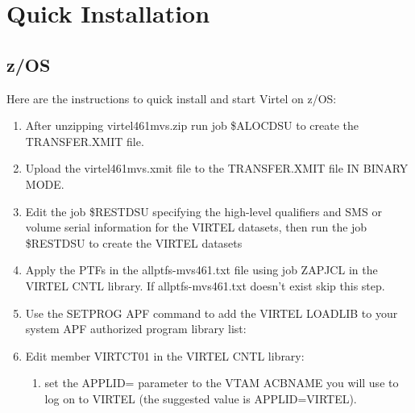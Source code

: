\documentclass[letterpaper,10pt,english]{sphinxmanual}
\begin{document}
\chapter{Quick Installation}
\label{\detokenize{Getting_Started:quick-installation}}

\section{z/OS}
\label{\detokenize{Getting_Started:z-os}}
Here are the instructions to quick install and start Virtel on z/OS:
\begin{enumerate}
\def\theenumi{\arabic{enumi}}
\def\labelenumi{\theenumi .}
\makeatletter\def\p@enumii{\p@enumi \theenumi .}\makeatother
\item {} 
After unzipping virtel461mvs.zip run job \$ALOCDSU to create the TRANSFER.XMIT file.

\item {} 
Upload the virtel461mvs.xmit file to the TRANSFER.XMIT file IN BINARY MODE.

\item {} 
Edit the job \$RESTDSU specifying the high-level qualifiers and SMS or volume serial information for the VIRTEL datasets, then run the job \$RESTDSU to create the VIRTEL datasets

\item {} 
Apply the PTFs in the allptfs-mvs461.txt file using job ZAPJCL in the VIRTEL CNTL library. If allptfs-mvs461.txt doesn’t exist skip this step.

\item {} 
Use the SETPROG APF command to add the VIRTEL LOADLIB to your system APF authorized program library list:

\begin{sphinxVerbatim}[commandchars=\\\{\}]
 
\end{sphinxVerbatim}

\item {} 
Edit member VIRTCT01 in the VIRTEL CNTL library:
\begin{enumerate}
\def\theenumii{\alph{enumii}}
\def\labelenumii{(\theenumii )}
\makeatletter\def\p@enumiii{\p@enumii (\theenumii )}\makeatother
\item {} 
set the APPLID= parameter to the VTAM ACBNAME you will use to log
on to VIRTEL (the suggested value is APPLID=VIRTEL).


\end{enumerate}
\end{enumerate}
\end{document}

